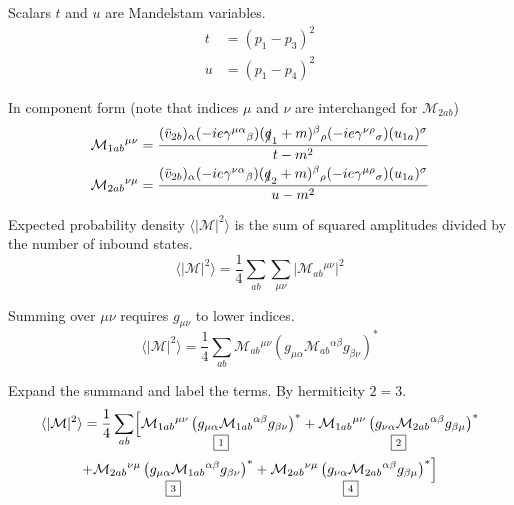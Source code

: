 Scalars $t$ and $u$ are Mandelstam variables.
\begin{align*}
t&=(p_1-p_3)^2
\\
u&=(p_1-p_4)^2
\end{align*}

In component form (note that indices $\mu$ and $\nu$ are interchanged for $\mathcal M_{2ab}$)
\begin{align*}
\mathcal M_{1ab}{}^{\mu\nu}&=\frac{
(\bar v_{2b})_\alpha
(-ie\gamma^{\mu\alpha}{}_\beta)
(\slashed q_1+m)^\beta{}_\rho
(-ie\gamma^{\nu\rho}{}_\sigma)
(u_{1a})^\sigma}{t-m^2}
\\
\mathcal M_{2ab}{}^{\nu\mu}&=\frac{
(\bar v_{2b})_\alpha
(-ie\gamma^{\nu\alpha}{}_\beta)
(\slashed q_2+m)^\beta{}_\rho
(-ie\gamma^{\mu\rho}{}_\sigma)
(u_{1a})^\sigma}{u-m^2}
\end{align*}

Expected probability density $\langle|\mathcal M|^2\rangle$
is the sum of squared amplitudes divided by the number of inbound states.
\begin{equation*}
\langle|\mathcal M|^2\rangle
=\frac{1}{4}\sum_{ab}\sum_{\mu\nu}\bigl|\mathcal M_{ab}{}^{\mu\nu}\bigr|^2
\end{equation*}

Summing over $\mu\nu$ requires $g_{\mu\nu}$ to lower indices.
\begin{equation*}
\langle|\mathcal M|^2\rangle
=\frac{1}{4}\sum_{ab}\mathcal M_{ab}{}^{\mu\nu}
\left(g_{\mu\alpha}\mathcal M_{ab}{}^{\alpha\beta}g_{\beta\nu}\right)^*
\end{equation*}

Expand the summand and label the terms.
By hermiticity $\boxed{\scriptstyle2}=\boxed{\scriptstyle3}$.
\begin{multline*}
\langle|\mathcal{M}|^2\rangle
=\frac{1}{4}\sum_{ab}\Bigl[
\underset{\boxed{\scriptstyle1}}
{\mathcal M_{1ab}{}^{\mu\nu}\left(g_{\mu\alpha}\mathcal M_{1ab}{}^{\alpha\beta}g_{\beta\nu}\right)^*}
+
\underset{\boxed{\scriptstyle2}}
{\mathcal M_{1ab}{}^{\mu\nu}\left(g_{\nu\alpha}\mathcal M_{2ab}{}^{\alpha\beta}g_{\beta\mu}\right)^*}
\\
+
\underset{\boxed{\scriptstyle3}}
{\mathcal M_{2ab}{}^{\nu\mu}\left(g_{\mu\alpha}\mathcal M_{1ab}{}^{\alpha\beta}g_{\beta\nu}\right)^*}
+
\underset{\boxed{\scriptstyle4}}
{\mathcal M_{2ab}{}^{\nu\mu}\left(g_{\nu\alpha}\mathcal M_{2ab}{}^{\alpha\beta}g_{\beta\mu}\right)^*}
\Bigr]
\end{multline*}

